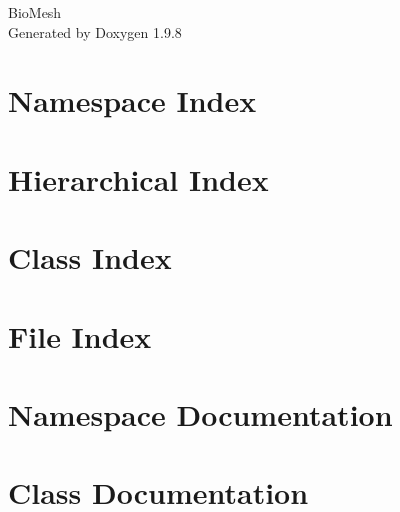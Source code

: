 \documentclass[twoside]{book}
\newcommand{\+}{\discretionary{\mbox{\scriptsize$\hookleftarrow$}}{}{}}
\newcommand{\clearemptydoublepage}{%
    \newpage{\pagestyle{empty}\cleardoublepage}%
  }
\begin{document}
  \raggedbottom
    \hypersetup{pageanchor=false,
                bookmarksnumbered=true,
                pdfencoding=unicode
               }
  \begin{titlepage}
  \vspace*{7cm}
  \begin{center}%
  {\Large Bio\+Mesh}\\
  \vspace*{1cm}
  {\large Generated by Doxygen 1.9.8}\\
  \end{center}
  \end{titlepage}
  \clearemptydoublepage
  \tableofcontents
  \clearemptydoublepage
  \hypersetup{pageanchor=true}
\chapter{Namespace Index}

\chapter{Hierarchical Index}

\chapter{Class Index}

\chapter{File Index}

\chapter{Namespace Documentation}



\chapter{Class Documentation}















\end{document}
